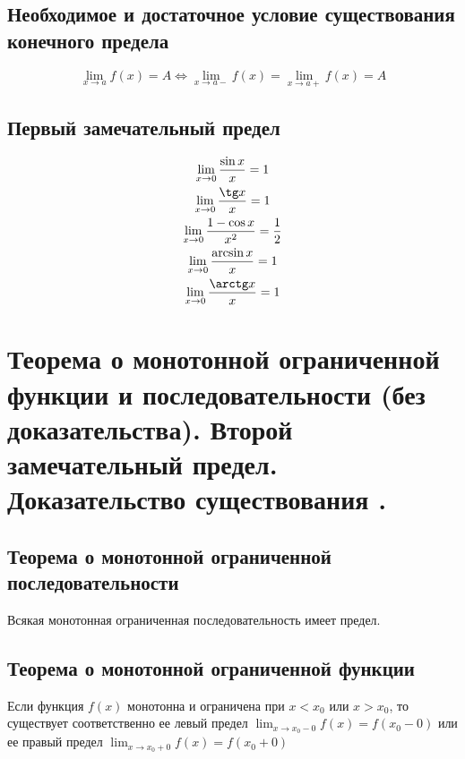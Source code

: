 \documentclass[12pt, fleqn]{article}
\begin{document}
\subsection{Необходимое и достаточное условие существования конечного предела}
$$\lim_{x \to a}f(x)=A \Leftrightarrow \lim_{x \to a-}f(x)=\lim_{x \to a+}f(x)=A$$
\subsection{Первый замечательный предел}
\begin{multline*}
	\lim_{x \to 0}\frac{\sin x}{x}=1\\
	\lim_{x \to 0}\frac{\tg x}{x}=1\\
	\lim_{x \to 0}\frac{1 - \cos x}{x^2}=\frac{1}{2}\\
	\lim_{x \to 0}\frac{\arcsin x}{x}=1\\
	\lim_{x \to 0}\frac{\arctg x}{x}=1\\
\end{multline*}
\section{Теорема о монотонной ограниченной функции и последовательности (без доказательства). Второй  замечательный предел. Доказательство существования .  }
\subsection{Теорема о монотонной ограниченной последовательности}
Всякая монотонная ограниченная последовательность имеет предел.\\
\subsection{Теорема о монотонной ограниченной функции}
Если функция $f(x)$ монотонна и ограничена при $x<x_0$ или $x>x_0$, то существует соответственно ее левый предел $\lim_{x \to x_0-0}f(x)=f(x_0-0)$ или ее правый предел $\lim_{x \to x_0+0}f(x)=f(x_0+0)$
\end{document}
